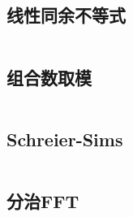 \subsection{线性同余不等式}
\inputminted{cpp}{\source/number-theory/linear-inequaltion.cpp}
\subsection{组合数取模}
\inputminted{cpp}{\source/number-theory/module.cpp}
\subsection{Schreier-Sims}
\inputminted{cpp}{\source/number-theory/SchreierSims.cpp}
\subsection{分治FFT}
\inputminted{cpp}{\source/number-theory/cdq-fft.cpp}
